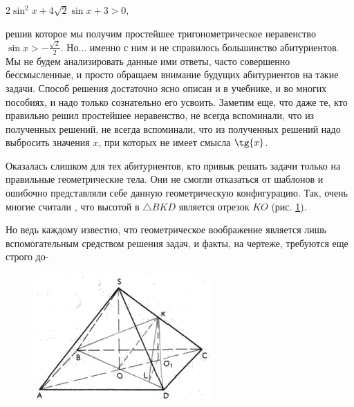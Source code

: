 \begin{multicols}{2}
\centerline{$2\sin^{2}{x} + 4 \sqrt{2} \sin{x} + 3 > 0,$}

\noindent
решив которое мы получим простейшее тригонометрическое неравенство $\sin{x} > - \tfrac{\sqrt{2}}{2}$. Но... именно с ним и не справилось большинство абитуриентов. Мы не будем анализировать данные ими ответы, часто совершенно бессмысленные, и просто обращаем внимание будущих абитуриентов на такие задачи. Способ решения достаточно ясно описан и в учебнике, и во многих пособиях, и надо только сознательно его усвоить. Заметим еще, что даже те, кто правильно решил простейшее неравенство, не всегда вспоминали, что из полученных решений, не всегда вспоминали, что из полученных решений надо выбросить значения $x$, при которых не имеет смысла $\tg{x}$.

\task Оказалась слишком  для тех абитуриентов, кто привык решать задачи только на правильные геометрические тела. Они не смогли отказаться от шаблонов и ошибочно представляли себе данную геометрическую конфигурацию. Так, очень многие считали , что высотой в $\triangle BKD$ является отрезок $KO$ (рис. \ref{fig:70-triangle}).

Но ведь каждому известно, что геометрическое воображение является лишь вспомогательным средством решения задач, и факты,  на чертеже, требуются еще строго до-

\begin{figure}[H]
    \hfill %
    \includegraphics[width=.4\textwidth]{kvant_70-triangle-transparent.png}
    \caption{{}}
    \label{fig:70-triangle}
\end{figure}

\end{multicols}